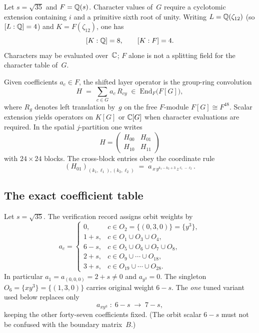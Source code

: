 \begin{definition}\label{def:v17-fields}
Let $s=\sqrt{35}$ and $F=\mathbb{Q}(s)$. Character values of~$G$ require a cyclotomic extension containing $i$ and a primitive sixth root of unity. Writing $L=\mathbb{Q}(\zeta_{12})$ (so $[L:\mathbb{Q}]=4$) and $K=F(\zeta_{12})$, one has
\[
[K:\mathbb{Q}]=8,\qquad [K:F]=4.
\]
Characters may be evaluated over~$\mathbb{C}$; $F$ alone is not a splitting field for the character table of~$G$.
\end{definition}

\begin{definition}\label{def:v17-H}
Given coefficients $a_c\in F$, the shifted layer operator is the group-ring convolution
\[
H\;=\;\sum_{c\in G}a_c\,R_{cy}\;\in\;\mathrm{End}_F\bigl(F[G]\bigr),
\]
where $R_g$ denotes left translation by~$g$ on the free $F$-module $F[G]\cong F^{48}$. Scalar extension yields operators on $K[G]$ or $\mathbb{C}[G]$ when character evaluations are required. In the spatial $j$-partition one writes
\[
H=\begin{pmatrix}H_{00}&H_{01}\\ H_{10}&H_{11}\end{pmatrix}
\]
with $24\times24$ blocks. The cross-block entries obey the coordinate rule
\begin{equation}\label{eq:v17-H01-entry}
(H_{01})_{(k_1,\ell_1),(k_2,\ell_2)}
\;=\;
a_{\,x\, y^{k_1-k_2+3}\, z^{\ell_1-\ell_2}}.
\end{equation}
\end{definition}

\subsection{The exact coefficient table}
\begin{definition}\label{def:v17-table}
Let $s=\sqrt{35}$. The verification record assigns orbit weights by
\[
a_c=
\begin{cases}
0,& c\in O_2=\{(0,3,0)\}= \{y^3\},\\
1+s,& c\in O_1\cup O_3\cup O_4,\\
6-s,& c\in O_5\cup O_6\cup O_7\cup O_8,\\
2+s,& c\in O_9\cup\cdots\cup O_{18},\\
3+s,& c\in O_{19}\cup\cdots\cup O_{28}.
\end{cases}
\]
In particular $a_1=a_{(0,0,0)}=2+s\neq0$ and $a_{y^3}=0$. The singleton $O_6=\{xy^3\}=\{(1,3,0)\}$ carries original weight $6-s$. The \emph{one} tuned variant used below replaces only
\[
a_{xy^3}\;:\;6-s\;\longrightarrow\;7-s,
\]
keeping the other forty-seven coefficients fixed. (The orbit scalar $6-s$ must not be confused with the boundary matrix~$B$.)
\end{definition}

